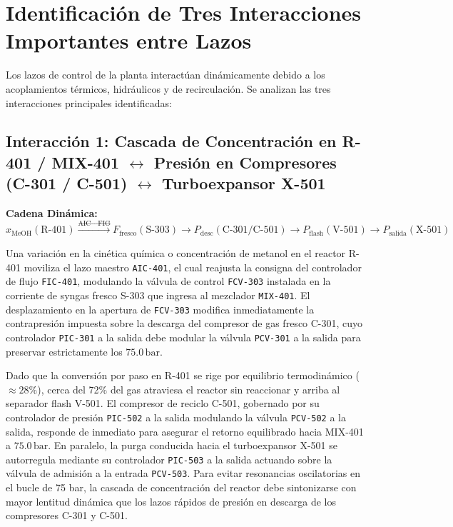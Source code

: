 \documentclass[10pt,letterpaper]{article}
\begin{document}
\newpage
\section{Identificación de Tres Interacciones Importantes entre Lazos}
Los lazos de control de la planta interactúan dinámicamente debido a los acoplamientos térmicos, hidráulicos y de recirculación. Se analizan las tres interacciones principales identificadas:

\subsection{Interacción 1: Cascada de Concentración en R-401 / MIX-401 \texorpdfstring{$\longleftrightarrow$}{ <-> } Presión en Compresores (C-301 / C-501) \texorpdfstring{$\longleftrightarrow$}{ <-> } Turboexpansor X-501}
\begin{center}
\textbf{Cadena Dinámica:} $x_{\text{MeOH}} (\text{R-401}) \xrightarrow{\text{AIC}\to\text{FIC}} F_{\text{fresco}} (\text{S-303}) \longrightarrow P_{\text{desc}} (\text{C-301/C-501}) \longrightarrow P_{\text{flash}} (\text{V-501}) \longrightarrow P_{\text{salida}} (\text{X-501})$
\end{center}
Una variación en la cinética química o concentración de metanol en el reactor R-401 moviliza el lazo maestro \texttt{AIC-401}, el cual reajusta la consigna del controlador de flujo \texttt{FIC-401}, modulando la válvula de control \texttt{FCV-303} instalada en la corriente de syngas fresco S-303 que ingresa al mezclador \texttt{MIX-401}. El desplazamiento en la apertura de \texttt{FCV-303} modifica inmediatamente la contrapresión impuesta sobre la descarga del compresor de gas fresco C-301, cuyo controlador \texttt{PIC-301} a la salida debe modular la válvula \texttt{PCV-301} a la salida para preservar estrictamente los $75.0\,\text{bar}$. 

Dado que la conversión por paso en R-401 se rige por equilibrio termodinámico ($\approx 28\%$), cerca del 72\% del gas atraviesa el reactor sin reaccionar y arriba al separador flash V-501. El compresor de reciclo C-501, gobernado por su controlador de presión \texttt{PIC-502} a la salida modulando la válvula \texttt{PCV-502} a la salida, responde de inmediato para asegurar el retorno equilibrado hacia MIX-401 a $75.0\,\text{bar}$. En paralelo, la purga conducida hacia el turboexpansor X-501 se autorregula mediante su controlador \texttt{PIC-503} a la salida actuando sobre la válvula de admisión a la entrada \texttt{PCV-503}. Para evitar resonancias oscilatorias en el bucle de 75 bar, la cascada de concentración del reactor debe sintonizarse con mayor lentitud dinámica que los lazos rápidos de presión en descarga de los compresores C-301 y C-501.
\end{document}
